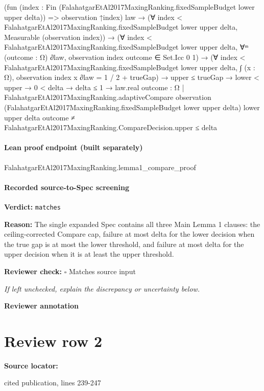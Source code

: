 \documentclass[10pt]{article}
\newcommand{\reviewerbox}{%
  \par\noindent\fbox{\parbox{0.96\linewidth}{\rule{0pt}{0.38in}}}\par
}
\newcommand{\reviewmatch}[1]{%
  \par\noindent\textbf{Reviewer check:} $\square$\; #1\par
  \noindent\emph{If left unchecked, explain the discrepancy or uncertainty below.}\par
}
\begin{document}
\begin{ReviewVerbatim}
          (fun (index : Fin (FalahatgarEtAl2017MaxingRanking.fixedSampleBudget lower upper delta)) =>
            observation ↑index)
          law →
        (∀ index < FalahatgarEtAl2017MaxingRanking.fixedSampleBudget lower upper delta,
            Measurable (observation index)) →
          (∀ index < FalahatgarEtAl2017MaxingRanking.fixedSampleBudget lower upper delta,
              ∀ᵐ (outcome : Ω) ∂law, observation index outcome ∈ Set.Icc 0 1) →
            (∀ index < FalahatgarEtAl2017MaxingRanking.fixedSampleBudget lower upper delta,
                ∫ (x : Ω), observation index x ∂law = 1 / 2 + trueGap) →
              upper ≤ trueGap →
                lower < upper →
                  0 < delta →
                    delta ≤ 1 →
                      law.real
                          {outcome : Ω |
                            FalahatgarEtAl2017MaxingRanking.adaptiveCompare observation
                                (FalahatgarEtAl2017MaxingRanking.fixedSampleBudget lower upper delta) lower upper delta
                                outcome ≠
                              FalahatgarEtAl2017MaxingRanking.CompareDecision.upper} ≤
                        delta
\end{ReviewVerbatim}

\paragraph{Lean proof endpoint (built separately)}\begin{ReviewVerbatim}
FalahatgarEtAl2017MaxingRanking.lemma1_compare_proof
\end{ReviewVerbatim}

\paragraph{Recorded source-to-Spec screening}
\textbf{Verdict:} \texttt{matches}
\\
{\raggedright
\textbf{Reason:} The single expanded Spec contains all three Main Lemma 1 clauses:\allowbreak{} the ceiling-\allowbreak{}corrected Compare cap, failure at most delta for the lower decision when the true gap is at most the lower threshold, and failure at most delta for the upper decision when it is at least the upper threshold.\allowbreak{}
\par}
\reviewmatch{Matches source input}
\noindent\textbf{Reviewer annotation}\par
\reviewerbox
\clearpage
\hypertarget{source-claim-adf0486f8077cbbe}{}
\section*{Review row 2}
\textbf{Source locator:} {\footnotesize\raggedright cited publication, lines 239-\allowbreak{}247\par}
\end{document}
